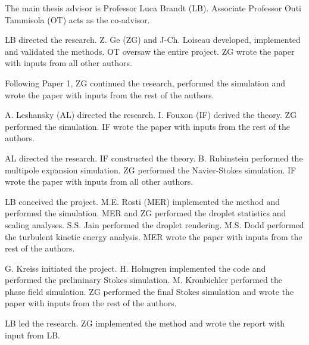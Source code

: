 \begin{divisionofwork}
	The main thesis advisor is Professor Luca Brandt (LB).
	Associate Professor Outi Tammisola (OT) acts as the co-advisor.

        \bigskip

	\paperitem
                LB directed the research.
                Z. Ge (ZG) and J-Ch. Loiseau developed, implemented and validated the methods.
                OT oversaw the entire project.
		ZG wrote the paper with inputs from all other authors.

	\paperitem
                Following Paper 1, ZG continued the research, performed the simulation
                and wrote the paper with inputs from the rest of the authors.

	\paperitem
                A. Leshansky (AL) directed the research.
                I. Fouxon (IF) derived the theory.
		ZG performed the simulation.
                IF wrote the paper with inputs from the rest of the authors.

	\paperitem
                AL directed the research.
                IF constructed the theory.
		B. Rubinstein performed the multipole expansion simulation.
                ZG performed the Navier-Stokes simulation.
                IF wrote the paper with inputs from all other authors.

	\paperitem
                LB conceived the project.
                M.E. Rosti (MER) implemented the method and performed the simulation.
		MER and ZG performed the droplet statistics and scaling analyses.
                S.S. Jain performed the droplet rendering.
                M.S. Dodd performed the turbulent kinetic energy analysis.
                MER wrote the paper with inputs from the rest of the authors.

	\paperitem
                G. Kreiss initiated the project.
                H. Holmgren implemented the code and performed the preliminary Stokes simulation.
                M. Kronbichler performed the phase field simulation.
		ZG performed the final Stokes simulation and 
                wrote the paper with inputs from the rest of the authors.

	\paperitem
                LB led the research.
		ZG implemented the method and wrote the report with input from LB.
               

\end{divisionofwork}


%
%
%


